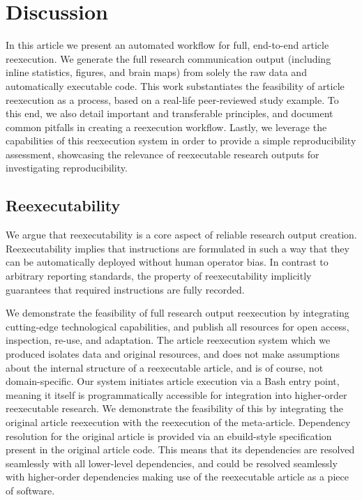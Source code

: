 \section{Discussion}

In this article we present an automated workflow for full, end-to-end article reexecution.
We generate the full research communication output (including inline statistics, figures, and brain maps) from solely the raw data and automatically executable code.
This work substantiates the feasibility of article reexecution as a process, based on a real-life peer-reviewed study example.
To this end, we also detail important and transferable principles, and document common pitfalls in creating a reexecution workflow.
Lastly, we leverage the capabilities of this reexecution system in order to provide a simple reproducibility assessment, showcasing the relevance of reexecutable research outputs for investigating reproducibility.

\subsection{Reexecutability}
We argue that reexecutability is a core aspect of reliable research output creation.
Reexecutability implies that instructions are formulated in such a way that they can be automatically deployed without human operator bias.
In contrast to arbitrary reporting standards, the property of reexecutability implicitly guarantees that required instructions are fully recorded.

We demonstrate the feasibility of full research output reexecution by integrating cutting-edge technological capabilities, and publish all resources for open access, inspection, re-use, and adaptation.
The article reexecution system which we produced isolates data and original resources, and does not make assumptions about the internal structure of a reexecutable article, and is of course, not domain-specific.
Our system initiates article execution via a Bash entry point, meaning it itself is programmatically accessible for integration into higher-order reexecutable research.
We demonstrate the feasibility of this by integrating the original article reexecution with the reexecution of the meta-article.
Dependency resolution for the original article is provided via an ebuild-style specification present in the original article code.
This means that its dependencies are resolved seamlessly with all lower-level dependencies, and could be resolved seamlessly with higher-order dependencies making use of the reexecutable article as a piece of software.

